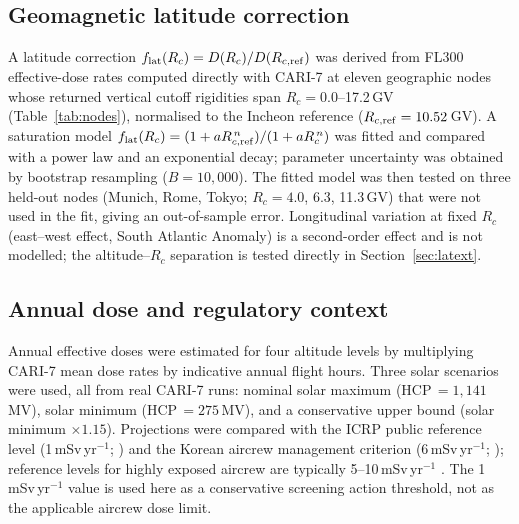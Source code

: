 \documentclass[11pt,a4paper]{article}
\begin{document}
\subsection{Geomagnetic latitude correction}
\label{sec:flat}
A latitude correction $f_{\rm lat}(R_c)=D(R_c)/D(R_{c,\rm ref})$ was
derived from FL300 effective-dose rates computed directly with CARI-7 at
eleven geographic nodes whose returned vertical cutoff rigidities
\citep{smart2009cutoff} span $R_c=0.0$--17.2\,GV (Table~\ref{tab:nodes}),
normalised to the Incheon
reference ($R_{c,\rm ref}=10.52$\,GV). A saturation model
$f_{\rm lat}(R_c)=(1+aR_{c,\rm ref}^{\,n})/(1+aR_c^{\,n})$ was fitted and
compared with a power law and an exponential decay; parameter uncertainty
was obtained by bootstrap resampling ($B=10{,}000$). The fitted model was
then tested on three held-out nodes (Munich, Rome, Tokyo; $R_c=4.0$, 6.3,
11.3\,GV) that were not used in the fit, giving an out-of-sample error.
Longitudinal variation at fixed $R_c$ (east--west effect, South Atlantic
Anomaly) is a second-order effect and is not modelled; the altitude--$R_c$
separation is tested directly in Section~\ref{sec:latext}.

\subsection{Annual dose and regulatory context}
\label{sec:annual}
Annual effective doses were estimated for four altitude levels by
multiplying CARI-7 mean dose rates by indicative annual flight hours.
Three solar scenarios were used, all from real CARI-7 runs: nominal solar
maximum (HCP\,$=1{,}141$\,MV), solar minimum (HCP\,$=275$\,MV), and a
conservative upper bound (solar minimum $\times1.15$). Projections were
compared with the ICRP public reference level (1\,mSv\,yr$^{-1}$;
\citealp{icrp2007}) and the Korean aircrew management criterion
(6\,mSv\,yr$^{-1}$; \citealp{knssc2021}); reference levels for highly
exposed aircrew are typically 5--10\,mSv\,yr$^{-1}$ \citep{icrp132}. The
1\,mSv\,yr$^{-1}$ value is used here as a conservative screening action
threshold, not as the applicable aircrew dose limit.
\end{document}
